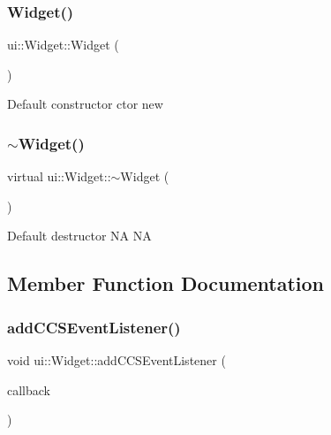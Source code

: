 \subsubsection{\texorpdfstring{Widget()}{Widget()}\hspace{0.1cm}{\footnotesize\ttfamily [2/2]}}
{\footnotesize\ttfamily ui\+::\+Widget\+::\+Widget (\begin{DoxyParamCaption}\item[{void}]{ }\end{DoxyParamCaption})}

Default constructor  ctor  new \mbox{\label{classui_1_1Widget_a3c972f87a8311912094924be09218e26}} 
\subsubsection{\texorpdfstring{$\sim$\+Widget()}{~Widget()}\hspace{0.1cm}{\footnotesize\ttfamily [2/2]}}
{\footnotesize\ttfamily virtual ui\+::\+Widget\+::$\sim$\+Widget (\begin{DoxyParamCaption}{ }\end{DoxyParamCaption})\hspace{0.3cm}{\ttfamily [virtual]}}

Default destructor  NA  NA 

\subsection{Member Function Documentation}
\mbox{\label{classui_1_1Widget_acf4c0f85e9c868801632bed8dae9dae1}} 
\subsubsection{\texorpdfstring{add\+C\+C\+S\+Event\+Listener()}{addCCSEventListener()}\hspace{0.1cm}{\footnotesize\ttfamily [1/2]}}
{\footnotesize\ttfamily void ui\+::\+Widget\+::add\+C\+C\+S\+Event\+Listener (\begin{DoxyParamCaption}\item[{const \hyperlink{classui_1_1Widget_a15b83a56c3c29442ec103100b45e56c7}{cc\+Widget\+Event\+Callback} \&}]{callback }\end{DoxyParamCaption})\hspace{0.3cm}{\ttfamily [virtual]}}

